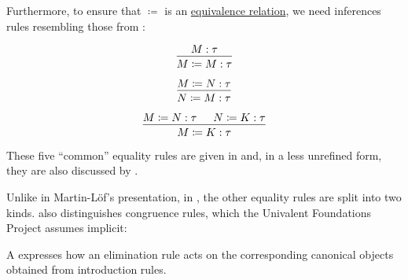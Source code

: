 \begin{remark}
\begin{thmenum}
    Furthermore, to ensure that \( {\coloneqq} \) is an \hyperref[def:equivalence_relation]{equivalence relation}, we need inferences rules resembling those from :
    \begin{paracol}{3}
      \begin{nthcolumn}{0}
        \ParacolAlignmentHack
        \begin{equation*}
          \begin{prooftree}
            \hypo{ M: \tau }
            \infer1{ M \coloneqq M: \tau }
          \end{prooftree}
        \end{equation*}
      \end{nthcolumn}

      \begin{nthcolumn}{1}
        \ParacolAlignmentHack
        \begin{equation*}
          \begin{prooftree}
            \hypo{ M \coloneqq N: \tau }
            \infer1{ N \coloneqq M: \tau }
          \end{prooftree}
        \end{equation*}
      \end{nthcolumn}

      \begin{nthcolumn}{2}
        \ParacolAlignmentHack
        \begin{equation*}
          \begin{prooftree}
            \hypo{ M \coloneqq N: \tau }
            \hypo{ N \coloneqq K: \tau }
            \infer2{ M \coloneqq K: \tau }
          \end{prooftree}
        \end{equation*}
      \end{nthcolumn}
    \end{paracol}
    \columnratio{}

    These five \enquote{common} equality rules are given in \cite[433]{UnivalentProject2024OctoberHoTT} and, in a less unrefined form, they are also discussed by .

    Unlike in Martin-L\"of's presentation, in \cite[27]{UnivalentProject2024OctoberHoTT}, the other equality rules are split into two kinds.  also distinguishes congruence rules, which the Univalent Foundations Project assumes implicit:
    \begin{thmenum}
       A  expresses how an elimination rule acts on the corresponding canonical objects obtained from introduction rules.


\end{thmenum}
\end{thmenum}
\end{remark}
